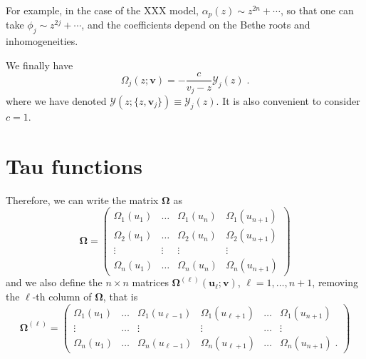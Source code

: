 \documentclass[a4paper,11pt]{amsart}
\begin{document}
For example, in the case of the XXX model, \(\alpha_p(z)\sim z^{2n} + \cdots\), so
that one can take \(\phi_j \sim z^{2j} + \cdots\), and the coefficients depend on the
Bethe roots and inhomogeneities.

We finally have 
\begin{equation}
  \Omega_{j}(z; \bm{v}) = -\frac{c}{v_j - z} \mathcal{Y}_j(z) \; .
\end{equation}
where we have denoted \( \mathcal{Y}(z; \{z,\bm{v}_j\}) \equiv \mathcal{Y}_j(z)\).
It is also convenient to consider \(c=1\). 



\section{Tau functions}

Therefore, we can write the matrix \(\bm{\Omega}\) as 
\begin{equation}
  \bm{\Omega} =
  \begin{pmatrix}
    \Omega_1(u_1) & \dots & \Omega_1(u_n) & \Omega_1(u_{n+1}) \\
    \Omega_2(u_1) & \dots & \Omega_2(u_n) & \Omega_2(u_{n+1}) \\
    \vdots & \vdots & \vdots & \vdots \\
    \Omega_n(u_1) & \dots & \Omega_n(u_n) & \Omega_n(u_{n+1})
  \end{pmatrix}
\end{equation}
and we also define the \(n\times n\) matrices \(\bm\Omega^{(\ell)}(\bm{u}_\ell; \bm{v})\),
\(\ell = 1, \dots, n+1\), removing the \(\ell\)-th column of
\(\bm{\Omega}\), that is
\begin{equation}
  \bm{\Omega}^{(\ell)} =
  \begin{pmatrix}
    \Omega_1(u_1) & \dots & \Omega_1(u_{\ell-1}) & \Omega_1(u_{\ell+1})&\dots & \Omega_1(u_{n+1}) \\
    \vdots & \dots & \vdots & \vdots & \dots & \vdots \\
    \Omega_n(u_1) & \dots & \Omega_n(u_{\ell-1}) & \Omega_n(u_{\ell+1})&\dots & \Omega_n(u_{n+1})\; .
  \end{pmatrix}
\end{equation}
\end{document}

